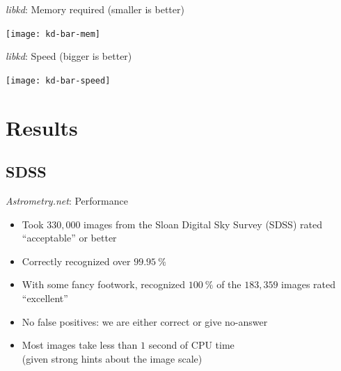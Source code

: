 \documentclass[compress]{beamer}
\newcommand{\an}{\emph{Astrometry.net}\xspace}
\newcommand{\libkd}{\emph{libkd}\xspace}
\begin{document}
\begin{frame}{\libkd: Memory required (smaller is better)}
\begin{center}
\texttt{[image: kd-bar-mem]}
\end{center}
\end{frame}

\begin{frame}{\libkd: Speed (bigger is better)}
\begin{center}
\texttt{[image: kd-bar-speed]}
\end{center}
\end{frame}



\section{Results}

\subsection{SDSS}

\begin{frame}{\an: Performance}
  \begin{itemize}
    \addtolength{\itemsep}{0.5ex}
  \item Took $330,000$ images from the Sloan Digital Sky Survey (SDSS) rated ``acceptable'' or better
  \item Correctly recognized over \alert{$99.95~\%$}
  \item With some fancy footwork, recognized \alert{$100~\%$} of the $183,359$ images rated ``excellent''
  \item \alert{No false positives}: we are either correct or give no-answer
  \item Most images take less than \alert{$1$ second} of CPU time
    \\ \small (given strong hints about the image scale)
  \end{itemize}
\end{frame}
\end{document}

